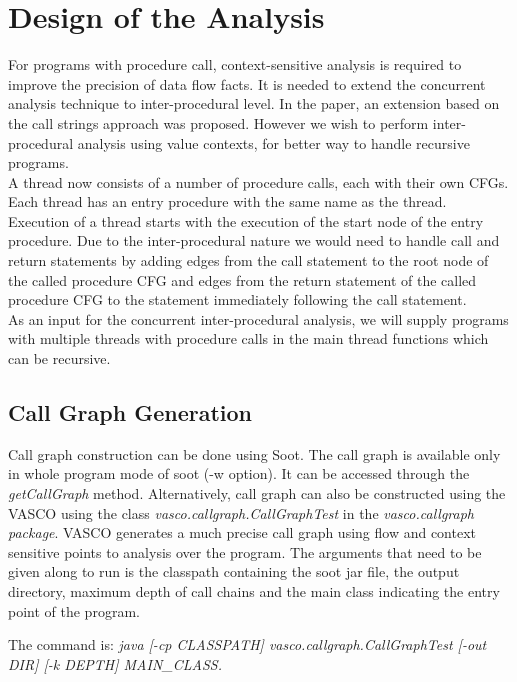 \chapter{Design of the Analysis}

For programs with procedure call, context-sensitive analysis is required to improve the precision of data flow facts. It is needed to extend the concurrent analysis technique to inter-procedural level. In the paper, an extension based on the call strings approach was proposed. However we wish to perform inter-procedural analysis using value contexts, for better way to handle recursive programs. \\

A thread now consists of a number of procedure calls, each with their own CFGs. Each thread has an entry procedure with the same name as the thread. Execution of a thread starts with the execution of the start node of the entry procedure. Due to the inter-procedural nature we would need to handle call and return statements by adding edges from the call statement to the root node of the called procedure CFG and edges from the return statement of the called procedure CFG to the statement immediately following the call statement. \\

As an input for the concurrent inter-procedural analysis, we will supply programs with multiple threads with procedure calls in the main thread functions which can be recursive. 

\section{Call Graph Generation}

Call graph construction can be done using Soot\cite{sootguide}. The call graph is available only in whole program mode of soot (-w option). It can be accessed through the \emph{getCallGraph} method. Alternatively, call graph can also be constructed using the VASCO using the class \emph{vasco.callgraph.CallGraphTest} in the \emph{vasco.callgraph package}. VASCO generates a much precise call graph using flow and context sensitive points to analysis over the program. The arguments that need to be given along to run is the classpath containing the soot jar file, the output directory, maximum depth of call chains and the main class indicating the entry point of the program. 

The command is: \newline
\emph{java [-cp CLASSPATH] vasco.callgraph.CallGraphTest [-out DIR] [-k DEPTH] MAIN\_CLASS.} \newline

